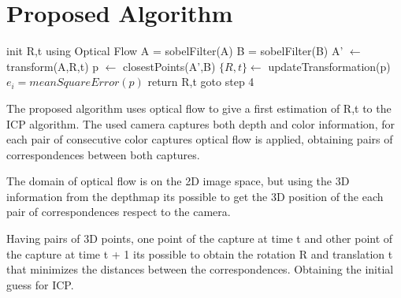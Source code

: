 \section{Proposed Algorithm}
\begin{algorithmic}[1]
\State init R,t using Optical Flow
\State A = sobelFilter(A)
\State B = sobelFilter(B)
\State A' $\leftarrow$ transform(A,R,t) 
\State p $\leftarrow$ closestPoints(A',B)
\State $\{R,t\} \gets$ updateTransformation(p)
\State $e_i = meanSquareError(p)$
	\State return R,t
\Else
	\State goto step 4
\EndIf
\end{algorithmic}

The proposed algorithm uses optical flow to give a first estimation of 
R,t to the ICP algorithm. The used camera captures both depth and color 
information, for each pair of consecutive color captures optical flow 
is applied, obtaining pairs of correspondences between both captures. 

The domain of optical flow is on the 2D image space, but using 
the 3D information from the depthmap its possible to get the 3D position 
of the each pair of correspondences respect to the camera. 

Having pairs of 3D points, one point of the capture at time t and other point 
of the capture at time t + 1 its possible to obtain the rotation R and translation t
 that minimizes the distances between the correspondences. Obtaining the initial guess 
 for ICP.




